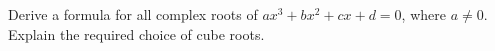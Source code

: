 Derive a formula for all complex roots of $ax^3+bx^2+cx+d=0$, where $a\ne0$. Explain the required choice of cube roots.
